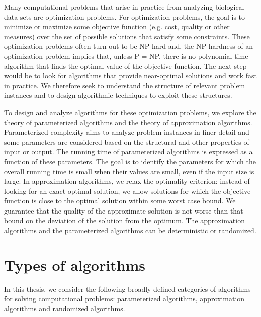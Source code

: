 Many computational problems that arise in practice from analyzing biological data sets are optimization problems.
For optimization problems, the goal is to minimize or maximize some objective function (e.g. cost, quality or other measures) over the set of possible solutions that satisfy some constraints.
These optimization problems often turn out to be NP-hard and, the
NP-hardness of an optimization problem implies that, unless P = NP, there is no polynomial-time algorithm
that finds the optimal value of the objective function. 
The next step would be to look for algorithms that provide near-optimal solutions and work fast in practice.
We therefore seek to understand the structure of relevant problem instances and to design algorithmic
techniques to exploit these structures.

To design and analyze algorithms for these optimization problems, we explore the theory of parameterized algorithms and the theory of approximation algorithms.
Parameterized complexity aims to analyze problem instances in finer detail and some parameters are considered based on the structural and other properties of input or output.
The running time of parameterized algorithms is expressed as a function of these parameters. 
The goal is to identify the parameters for which the overall running time is small when their values are small, even if the input size is large. 
In approximation algorithms, we relax the optimality criterion: instead of looking for an exact optimal solution,
we allow solutions for which the objective function is close to the optimal solution within some worst case bound.
We guarantee that the quality of the approximate solution is not worse than that bound on the deviation of the solution from the optimum.
The approximation algorithms and the parameterized algorithms can be deterministic or randomized.


\section{Types of algorithms}
In this thesis, we consider the following broadly defined categories of algorithms for solving computational problems: parameterized algorithms, approximation algorithms and randomized algorithms.

